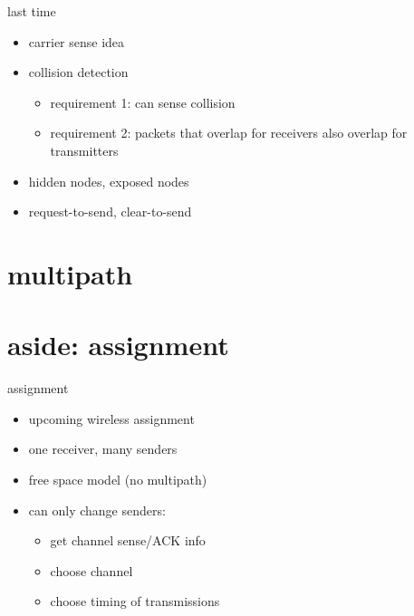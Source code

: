 \date{}
\title{}
\date{}

\begin{frame}
    \titlepage
\end{frame}


\begin{frame}{last time}
    \begin{itemize}
    \item carrier sense idea
    \item collision detection
        \begin{itemize}
        \item requirement 1: can sense collision
        \item requirement 2: packets that overlap for receivers also overlap for transmitters
        \end{itemize}
    \item hidden nodes, exposed nodes
    \item request-to-send, clear-to-send
    \end{itemize}
\end{frame}



\section{multipath}



\section{aside: assignment}
\begin{frame}{assignment}
    \begin{itemize}
    \item upcoming wireless assignment
    \item one receiver, many senders
    \item free space model (no multipath)
    \item can only change senders:
        \begin{itemize}
        \item get channel sense/ACK info
        \item choose channel
        \item choose timing of transmissions
        \end{itemize}
    \end{itemize}
\end{frame}

